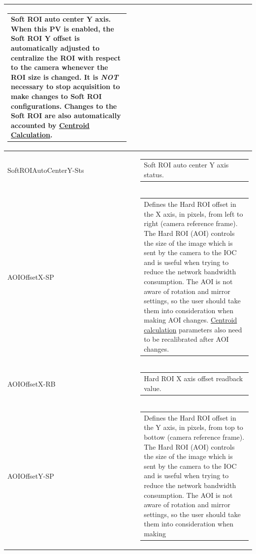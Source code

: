 \documentclass[openany]{article}
\begin{document}
\begin{longtable}{| m{3.0cm} m{4.5cm} m{7.0cm} |}
\begin{tabular}{@{}m{6cm}@{}}
                Soft ROI auto center Y axis. When this PV is enabled, the Soft ROI Y offset 
                is automatically adjusted to centralize the ROI with respect to the camera
                whenever the ROI size is changed. It is \emph{NOT} necessary to stop
                acquisition to make changes to Soft ROI configurations. Changes to the
                Soft ROI are also automatically accounted by 
                \hyperref[sec:centroid-calc]{Centroid Calculation}.
            \end{tabular} \\ \hline
        SoftROIAutoCenterY-Sts &  & \begin{tabular}{@{}m{6cm}@{}}
                Soft ROI auto center Y axis status.
            \end{tabular} \hypertarget{pv:hard-roi-off-x}{}\\ \hline
        AOIOffsetX-SP &  & \begin{tabular}{@{}m{6cm}@{}}
                Defines the Hard ROI offset in the X axis, in pixels, from left to right
                (camera reference frame). The Hard ROI (AOI) controls the size of the image
                which is sent by the camera to the IOC and is useful when trying to reduce
                the network bandwidth consumption. The AOI is not aware of rotation and
                mirror settings, so the user should take them into consideration when making
                AOI changes. \hyperref[sec:centroid-calc]{Centroid calculation} parameters
                also need to be recalibrated after AOI changes.
            \end{tabular} \\ \hline
        AOIOffsetX-RB &  & \begin{tabular}{@{}m{6cm}@{}}
                Hard ROI X axis offset readback value.
            \end{tabular} \hypertarget{pv:hard-roi-off-y}{}\\ \hline
        AOIOffsetY-SP &  & \begin{tabular}{@{}m{6cm}@{}}
                Defines the Hard ROI offset in the Y axis, in pixels, from top to bottow
                (camera reference frame). The Hard ROI (AOI) controls the size of the image
                which is sent by the camera to the IOC and is useful when trying to reduce
                the network bandwidth consumption. The AOI is not aware of rotation and
                mirror settings, so the user should take them into consideration when making

\end{tabular}
\end{longtable}
\end{document}
